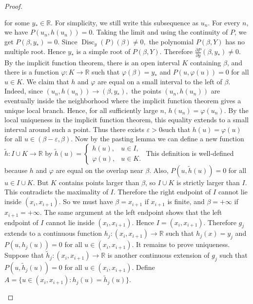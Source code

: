 \documentclass{article}
\begin{document}
\begin{proof}
\begin{enumerate}
               for some \(y_\ast\in\mathbb{R}.\) For simplicity, we still write this subsequence as \(u_n\). For every \(n\), we have \(P(u_n,h(u_n))=0.\) Taking the limit and using the continuity of \(P\), we get \(P(\beta,y_\ast)=0.\) Since \(\operatorname{Disc}_y(P)(\beta)\neq 0,\) the polynomial \(P(\beta,Y)\) has no multiple root. Hence \(y_\ast\) is a simple root of \(P(\beta,Y)\). Therefore \(\frac{\partial P}{\partial y}(\beta,y_\ast)\neq 0.\) By the implicit function theorem, there is an open interval \(K\) containing \(\beta\), and there is a function \(\varphi:K\to \mathbb{R}\) such that \(\varphi(\beta)=y_\ast\) and \(P(u,\varphi(u))=0\) for all \(u\in K\). We claim that \(h\) and \(\varphi\) are equal on a small interval to the left of \(\beta\). Indeed, since \((u_n,h(u_n))\to (\beta,y_\ast),\) the points \((u_n,h(u_n))\) are eventually inside the neighborhood where the implicit function theorem gives a unique local branch. Hence, for all sufficiently large \(n\), \(h(u_n)=\varphi(u_n).\) By the local uniqueness in the implicit function theorem, this equality extends to a small interval around such a point. Thus there exists \(\varepsilon>0\)such that \(h(u)=\varphi(u)\) for all \(u\in(\beta-\varepsilon,\beta).\) Now by the pasting lemma we can define a new function \(\widetilde h:I\cup K\to \mathbb{R}\) by \(\widetilde h(u)=\begin{cases}h(u), & u\in I,\\\varphi(u), & u\in K.\end{cases}\)
               This definition is well-defined because \(h\) and \(\varphi\) are equal on the overlap near \(\beta\). Also, \(P(u,\widetilde h(u))=0\) for all \(u\in I\cup K.\) But \(K\) contains points larger than \(\beta\), so \(I\cup K\) is strictly larger than \(I\). This contradicts the maximality of \(I\). Therefore the right endpoint of \(I\) cannot lie inside \((x_i,x_{i+1}).\) So we must have \(\beta=x_{i+1}\) if \(x_{i+1}\) is finite, and \(\beta=+\infty\) if \(x_{i+1}=+\infty\). The same argument at the left endpoint shows that the left endpoint of \(I\) cannot lie inside \((x_i,x_{i+1}).\) Hence \(I=(x_i,x_{i+1}).\) Therefore \(g_j\) extends to a continuous function \(h_j:(x_i,x_{i+1})\to \mathbb{R}\) such that \(h_j(x)=y_j\) and \(P(u,h_j(u))=0\) for all \(u\in (x_i,x_{i+1}).\) It remains to prove uniqueness. Suppose that \(\widetilde h_j:(x_i,x_{i+1})\to \mathbb{R}\) is another continuous extension of \(g_j\) such that \(P(u,\widetilde h_j(u))=0\) for all \(u\in (x_i,x_{i+1})\). Define \(A=\{u\in (x_i,x_{i+1}):h_j(u)=\widetilde h_j(u)\}.\)

\end{enumerate}
\end{proof}
\end{document}
